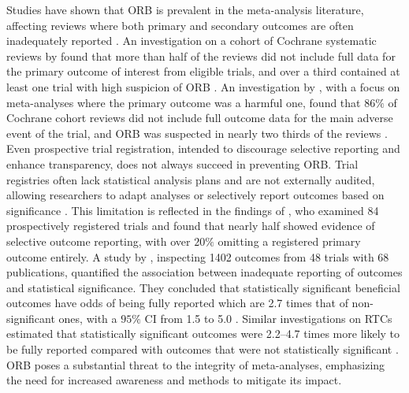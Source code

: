 \documentclass[twocolumn]{article}\usepackage[]{graphicx}\usepackage[]{xcolor}
\begin{document}
Studies have shown that ORB is prevalent in the meta-analysis literature, affecting reviews where both primary and secondary outcomes are often inadequately reported \citep{moreORBevidence, ORBimpact, ORBIT_paper, silva_many_2024, Thomas2022}. An investigation on a cohort of Cochrane systematic reviews by \citet{ORBimpact} found that more than half of the reviews did not include full data for the primary outcome of interest from eligible trials, and over a third contained at least one trial with high suspicion of ORB \citep{ORBimpact}. An investigation by \citet{ORBIT_paper}, with a focus on meta-analyses where the primary outcome was a harmful one, found that $86\%$ of Cochrane cohort reviews did not include full outcome data for the main adverse event of the trial, and ORB was suspected in nearly two thirds of the reviews \citep{ORBIT_paper}. Even prospective trial registration, intended to discourage selective reporting and enhance transparency, does not always succeed in preventing ORB. Trial registries often lack statistical analysis plans and are not externally audited, allowing researchers to adapt analyses or selectively report outcomes based on significance \citep{Thomas2022, silva_many_2024}. This limitation is reflected in the findings of \citet{silva_many_2024}, who examined 84 prospectively registered trials and found that nearly half showed evidence of selective outcome reporting, with over $20\%$ omitting a registered primary outcome entirely. A study by \citet{moreORBevidence}, inspecting 1402 outcomes from 48 trials with 68 publications, quantified the association between inadequate reporting of outcomes and statistical significance. They concluded that statistically significant beneficial outcomes have odds of being fully reported which are 2.7 times that of non-significant ones, with a $95 \%$ CI from 1.5 to 5.0 \citep{moreORBevidence}. Similar investigations on RTCs estimated that statistically significant outcomes were 2.2–4.7 times more likely to be fully reported compared with outcomes that were not statistically significant \citep{Thomas2022, Dwan2008}. ORB poses a substantial threat to the integrity of meta-analyses, emphasizing the need for increased awareness and methods to mitigate its impact.

\end{document}
